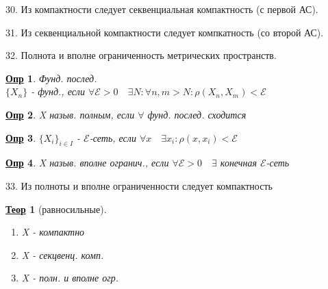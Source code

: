 \documentclass[12pt, fleqn]{article}
\newenvironment{question}[1]{\hspace*{-4em} #1}{\newpage}
\newcommand{\q}{\quad}
\theoremstyle{nonumbermarginbreak}
\newtheorem{theorem}{\hspace*{-2em}\underline{\bfseries Теор}}[section]
\newtheorem{definition}{\hspace*{-2em}\underline{\bfseries Опр}}[section]
\begin{document}
    \begin{question}{30. Из компактности следует секвенциальная компактность (с первой АС).}
        
    \end{question}

    \begin{question}{31. Из секвенциальной компактности следует компкатность (со второй АС).}
        
    \end{question}

    \begin{question}{32. Полнота и вполне ограниченность метрических пространств.}
        \begin{definition} 
            Фунд. послед.\\
            $\{X_n\}$ - фунд., если $\forall \mathcal{E} > 0 \q \exists N: \forall n, m > N: \rho(X_n, X_m) < \mathcal{E}$
        \end{definition}

        \begin{definition} 
            X назыв. полным, если $\forall$ фунд. послед. сходится
        \end{definition}

        \begin{definition} 
            $\{X_i\}_{i \in I}$ - $\mathcal{E}$-сеть, если $\forall x \q \exists x_i: \rho(x, x_i) < \mathcal{E}$
        \end{definition}

        \begin{definition} 
            X назыв. вполне огранич., если $\forall \mathcal{E} > 0 \q \exists$ конечная $\mathcal{E}$-сеть
        \end{definition}
    \end{question}

    \begin{question}{33. Из полноты и вполне ограниченности следует компактность}
        \begin{theorem} [равносильные]
                \begin{enumerate}
                    \item X - компактно
                    \item X - секцвенц. комп.
                    \item X - полн. и вполне огр.
                \end{enumerate}
        \end{theorem}
    \end{question}
\end{document}
